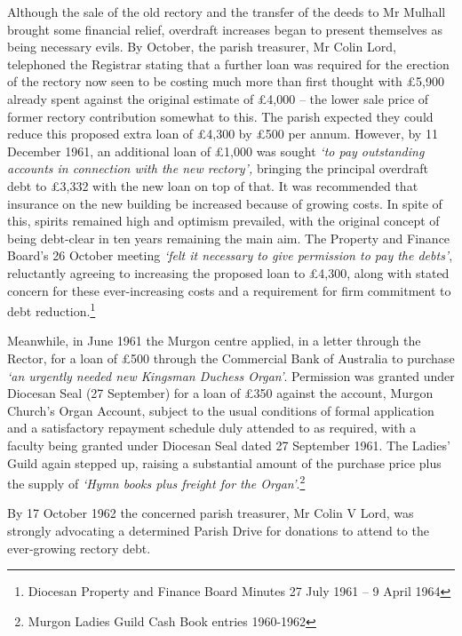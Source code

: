 Although the sale of the old rectory and the transfer of the deeds to Mr Mulhall brought some financial relief, overdraft increases began to present themselves as being necessary evils. By October, the parish treasurer, Mr Colin Lord, telephoned the Registrar stating that a further loan was required for the erection of the rectory now seen to be costing much more than first thought with \pounds5,900 already spent against the original estimate of \pounds4,000 -- the lower sale price of former rectory contribution somewhat to this. The parish expected they could reduce this proposed extra loan of \pounds4,300 by \pounds500 per annum. However, by 11 December 1961, an additional loan of \pounds1,000 was sought \emph{`to pay outstanding accounts in connection with the new rectory',} bringing the principal overdraft debt to \pounds3,332 with the new loan on top of that. It was recommended that insurance on the new building be increased because of growing costs. In spite of this, spirits remained high and optimism prevailed, with the original concept of being debt-clear in ten years remaining the main aim. The Property and Finance Board's 26 October meeting \emph{`felt it necessary to give permission to pay the debts'}, reluctantly agreeing to increasing the proposed loan to \pounds4,300, along with stated concern for these ever-increasing costs and a requirement for firm commitment to debt reduction.\footnote{Diocesan Property and Finance Board Minutes 27 July 1961 -- 9 April 1964}


Meanwhile, in June 1961 the Murgon centre applied, in a letter through the Rector, for a loan of \pounds500 through the Commercial Bank of Australia to purchase \emph{`an urgently needed new Kingsman Duchess Organ'}. Permission was granted under Diocesan Seal (27 September) for a loan of \pounds350 against the account, Murgon Church's Organ Account, subject to the usual conditions of formal application and a satisfactory repayment schedule duly attended to as required, with a faculty being granted under Diocesan Seal dated 27 September 1961. The Ladies' Guild again stepped up, raising a substantial amount of the purchase price plus the supply of \emph{`Hymn books plus freight for the Organ'}.\footnote{Murgon Ladies Guild Cash Book entries 1960-1962}


By 17 October 1962 the concerned parish treasurer, Mr Colin V Lord, was strongly advocating a determined Parish Drive for donations to attend to the ever-growing rectory debt.









